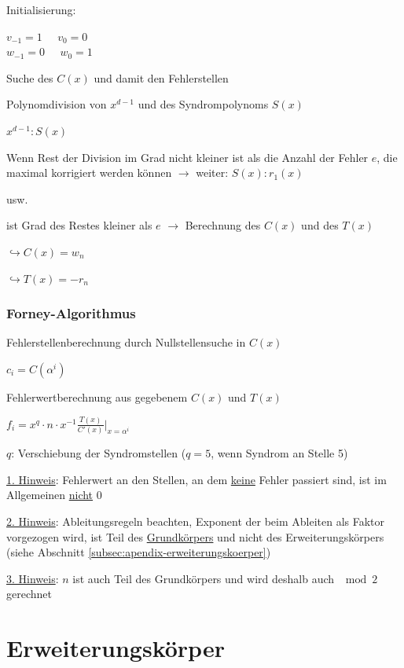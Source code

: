 Initialisierung:

$\displaystyle{
    v_{-1} = 1 \;\;\;\;\; v_0 = 0
}$\\
$\displaystyle{
    w_{-1} = 0 \;\;\;\;\; w_0 = 1
}$

Suche des $C(x)$ und damit den Fehlerstellen

Polynomdivision von $x^{d-1}$ und des Syndrompolynoms $S(x)$

$\displaystyle{
    x^{d-1} : S(x)
}$

Wenn Rest der Division im Grad nicht kleiner ist als die Anzahl der Fehler $e$, die maximal korrigiert
werden können $\rightarrow$ weiter: $S(x) : r_1(x)$

usw.

ist Grad des Restes kleiner als $e$ $\rightarrow$ Berechnung des $C(x)$ und des $T(x)$

$\hookrightarrow C(x) = w_n$

$\hookrightarrow T(x) = -r_n$

\subsubsection{Forney-Algorithmus}

Fehlerstellenberechnung durch Nullstellensuche in $C(x)$

$\displaystyle{
    c_i = C(\alpha^i)
}$

Fehlerwertberechnung aus gegebenem $C(x)$ und $T(x)$

$\displaystyle{
    f_i = x^q \cdot n \cdot x^{-1} \frac{T(x)}{C'(x)}\bigg \vert_{x=\alpha^i}
}$

$q$: Verschiebung der Syndromstellen ($q=5$, wenn Syndrom an Stelle 5)

\underline{1. Hinweis}: Fehlerwert an den Stellen, an dem \underline{keine} Fehler passiert sind, ist im Allgemeinen
\underline{nicht} 0

\underline{2. Hinweis}: Ableitungsregeln beachten, Exponent der beim Ableiten als Faktor vorgezogen wird, ist Teil des
\underline{Grundkörpers} und nicht des Erweiterungskörpers (siehe Abschnitt \ref{subsec:apendix-erweiterungskoerper})

\underline{3. Hinweis}: $n$ ist auch Teil des Grundkörpers und wird deshalb auch $\mod 2$ gerechnet

\section{Erweiterungskörper}

